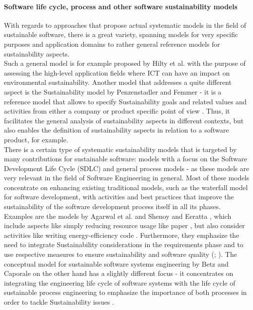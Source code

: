 \documentclass[oribibl]{llncs}
\begin{document}
\paragraph{Software life cycle, process and other software sustainability models}
With regards to approaches that propose actual systematic %
models in the field of sustainable software, there is a great variety, spanning models for very specific purposes and application domains %
to rather general reference models for sustainability aspects.\\
Such a general model is for example proposed by Hilty et al. \cite{hilty_relevance_2006} with the purpose of assessing the high-level application fields where ICT can have an impact on environmental sustainability. Another model that addresses a quite different aspect is the Sustainability model by Penzenstadler and Femmer \cite{penzenstadler_generic_2013} - it is a reference model that allows to specify Sustainability goals and related values and activities from either a company or product specific point of view \cite{penzenstadler_generic_2013}. Thus, it facilitates the general analysis of sustainability aspects in different contexts, but also enables the definition of sustainability aspects in relation to a software product, for example.\\
There is a certain type of systematic sustainability models that is targeted by many contributions for sustainable software: models with a focus on the Software Development Life Cycle (SDLC) %
and general process models - as these models are very relevant in the field of Software Engineering in general. Most of these models concentrate on enhancing existing traditional models, such as the waterfall model %
for software development, with activities and best practices that improve the sustainability of the software development process itself in all its phases. Examples are the models by Agarwal et al. \cite{agarwal_sustainable_2012} and Shenoy and Eeratta \cite{shenoy_green_2011}, which include aspects like simply reducing resource usage like paper \cite{shenoy_green_2011}, but also consider activities like writing energy-efficiency code \cite{agarwal_sustainable_2012}. Furthermore, they emphasize the need to integrate Sustainability considerations in the requirements phase and to use respective measures to ensure sustainability and software quality (\cite{agarwal_sustainable_2012}; \cite{shenoy_green_2011}). The conceptual model for sustainable software systems engineering by Betz and Caporale \cite{betz_sustainable_2014} on the other hand has a slightly different focus - it concentrates on integrating the engineering life cycle of software systems with the life cycle of sustainable process engineering to emphasize the importance of both processes in order to tackle Sustainability issues \cite{betz_sustainable_2014}.
\end{document}
